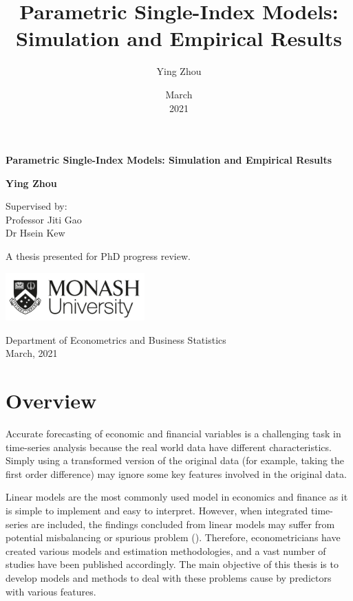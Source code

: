 \documentclass[a4paper,12pt,times,numbered,print,index]{report}
\title{{Parametric Single-Index Models: Simulation and Empirical Results} \vspace{2cm}}
\author{Ying Zhou}
\date{March \\ 2021}
\numberwithin{equation}{section}
\begin{document}
\begin{titlepage}
	\begin{center}
		\vspace*{1cm}
			
		\Huge
		\textbf{Parametric Single-Index Models: Simulation and Empirical Results}
			
		\vspace{2.5cm}
			
		\large
		\textbf{Ying Zhou} \\
			
		\vspace{0.5cm}
			
		Supervised by: \\
		Professor Jiti Gao \\
		Dr Hsein Kew
			
		\vfill
			
		A thesis presented for PhD progress review.
			
		\vspace{0.8cm}
			
		\includegraphics[width=0.4\textwidth]{plots/monash-university-logo.png}
			
		Department of Econometrics and Business Statistics \\
			
		March,  2021
			
	\end{center}
\end{titlepage}
	
	
\section{Overview}
Accurate forecasting of economic and financial variables is a challenging task in time-series analysis because the real world data have different characteristics. Simply using a transformed version of the original data (for example, taking the first order difference) may ignore some key features involved in the original data.

Linear models are the most commonly used model in economics and finance as it is simple to implement and easy to interpret. However, when integrated time-series are included, the findings concluded from linear models may suffer from potential misbalancing or spurious problem (\cite{phillips2015halbert}). Therefore, econometricians have created various models and estimation methodologies, and a vast number of studies have been published accordingly. The main objective of this thesis is to develop models and methods to deal with these problems cause by predictors with various features. 
\end{document}
